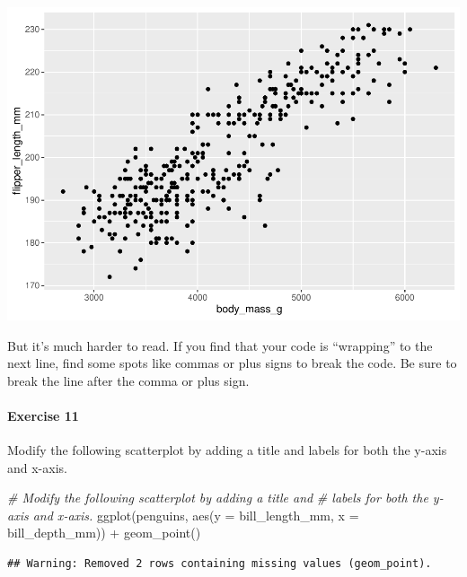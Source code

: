 \documentclass[
]{book}
\newenvironment{Shaded}{\begin{snugshade}}{\end{snugshade}}
\newcommand{\AttributeTok}[1]{\textcolor[rgb]{0.77,0.63,0.00}{#1}}
\newcommand{\CommentTok}[1]{\textcolor[rgb]{0.56,0.35,0.01}{\textit{#1}}}
\newcommand{\FunctionTok}[1]{\textcolor[rgb]{0.00,0.00,0.00}{#1}}
\newcommand{\NormalTok}[1]{#1}
\newcommand{\SpecialCharTok}[1]{\textcolor[rgb]{0.00,0.00,0.00}{#1}}
\begin{document}
\includegraphics{intro_stats_files/figure-latex/unnamed-chunk-114-1.pdf}

But it's much harder to read. If you find that your code is ``wrapping'' to the next line, find some spots like commas or plus signs to break the code. Be sure to break the line after the comma or plus sign.

\hypertarget{exercise-11-1}{%
\paragraph*{Exercise 11}\label{exercise-11-1}}

Modify the following scatterplot by adding a title and labels for both the y-axis and x-axis.

\begin{Shaded}
\begin{Highlighting}[]
\CommentTok{\# Modify the following scatterplot by adding a title and }
\CommentTok{\# labels for both the y{-}axis and x{-}axis.}
\FunctionTok{ggplot}\NormalTok{(penguins, }\FunctionTok{aes}\NormalTok{(}\AttributeTok{y =}\NormalTok{ bill\_length\_mm, }\AttributeTok{x =}\NormalTok{ bill\_depth\_mm)) }\SpecialCharTok{+}
    \FunctionTok{geom\_point}\NormalTok{()}
\end{Highlighting}
\end{Shaded}

\begin{verbatim}
## Warning: Removed 2 rows containing missing values (geom_point).
\end{verbatim}
\end{document}
